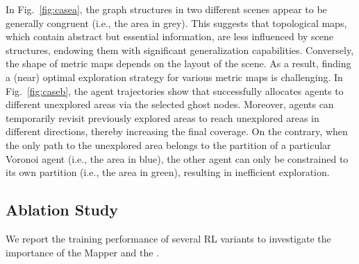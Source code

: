 In Fig.~\ref{fig:casea}, the graph structures in two different scenes appear to be generally congruent (i.e., the area in grey). This suggests that topological maps, which contain abstract but essential information, are less influenced by scene structures, endowing them with significant generalization capabilities. Conversely, the shape of metric maps depends on the layout of the scene. As a result, finding a (near) optimal exploration strategy for various metric maps is challenging.
In Fig.~\ref{fig:caseb}, the agent trajectories show that {\name} successfully allocates agents to different unexplored areas via the selected ghost nodes. Moreover, {\name} agents can temporarily revisit previously explored areas to reach unexplored areas in different directions, thereby increasing the final coverage. 
On the contrary, when the only path to the unexplored area belongs to the partition of a particular Voronoi agent (i.e., the area in blue), the other agent can only be constrained to its own partition (i.e., the area in green), resulting in inefficient exploration.



\iffalse
\subsubsection{Asynchronized Evaluation}
We consider an asynchronized situation where some agents loss their connection during exploration so that the message received by these agents is incomplete. In~\cref{tab: hm3d_results}



\fi

\iffalse

\begin{figure}[h]
	\centering
    \texttt{[image: figures/real.png]}
	\centering \caption{The deployment of real-world robot system. }
\label{fig:real}

\end{figure}
\fi




\vspace{-1mm}
\subsection{Ablation Study}
We report the training performance of several RL variants to investigate the importance of the Mapper and the {\planner}.

